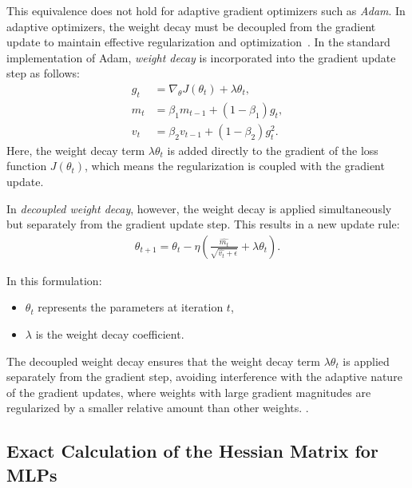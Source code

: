 This equivalence does not hold for adaptive gradient optimizers
such as \emph{Adam}. In adaptive optimizers, the weight decay must be decoupled from the gradient update to
maintain effective regularization and optimization~\cite{Loshchilov2017FixingWD}. In the standard implementation of Adam, \emph{weight decay} is incorporated into the gradient update step as follows:
\begin{align*}
    g_t &= \nabla_{\theta} J(\theta_t) + \lambda \theta_t, \\
    m_t &= \beta_1 m_{t-1} + (1 - \beta_1) g_t, \\
    v_t &= \beta_2 v_{t-1} + (1 - \beta_2) g_t^2.
    \end{align*}
Here, the weight decay term $\lambda \theta_t$ is added directly to the gradient of the loss function $J(\theta_t)$, which means the regularization is coupled with the gradient update.


In \emph{decoupled weight decay}, however, the weight decay is applied simultaneously but separately from the gradient update step. This results in a new update rule:
\begin{align}
\theta_{t+1} = \theta_t - \eta (\frac{ \hat{m_t}}{\sqrt{\hat{v_t} + \epsilon}} + \lambda \theta_t).
\end{align}

In this formulation:
\begin{itemize}
  \item $\theta_t$ represents the parameters at iteration $t$,
  \item $\lambda$ is the weight decay coefficient.
\end{itemize}

The decoupled weight decay ensures that the weight decay term $\lambda \theta_t$ is applied separately from the gradient step,
avoiding interference with the adaptive nature of the gradient updates, where weights with large gradient magnitudes are regularized by a smaller relative
amount than other weights. \cite{Loshchilov2017FixingWD}.


\subsection{Exact Calculation of the Hessian Matrix for MLPs \cite{Bishop1992}}
\label{sec:hessian_exact}

